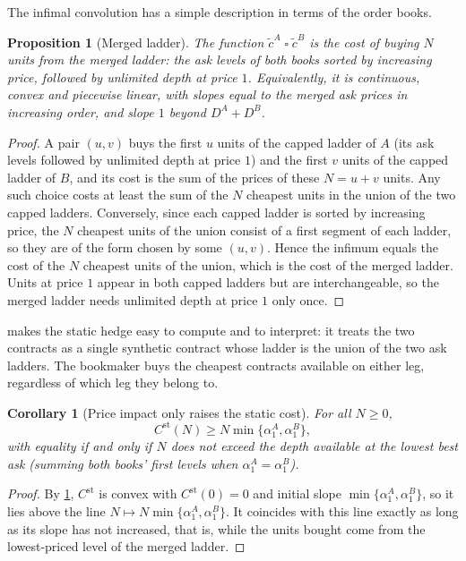 \documentclass[11pt,a4paper]{article}
\theoremstyle{plain}
\newtheorem{proposition}[theorem]{Proposition}
\newtheorem{corollary}[theorem]{Corollary}
\theoremstyle{definition}
\theoremstyle{remark}
\newcommand{\1}{\mathbf{1}}
\newcommand{\infconv}{\mathbin{\square}}
\begin{document}
The infimal convolution has a simple description in terms of the order books.

\begin{proposition}[Merged ladder]
\label{prop:merged}
The function $\tilde c^A\infconv\tilde c^B$ is the cost of buying $N$ units from the \emph{merged ladder}: the ask levels of both books sorted by increasing price, followed by unlimited depth at price $1$. Equivalently, it is continuous, convex and piecewise linear, with slopes equal to the merged ask prices in increasing order, and slope $1$ beyond $D^A+D^B$.
\end{proposition}

\begin{proof}
A pair $(u,v)$ buys the first $u$ units of the capped ladder of $A$ (its ask levels followed by unlimited depth at price $1$) and the first $v$ units of the capped ladder of $B$, and its cost is the sum of the prices of these $N=u+v$ units. Any such choice costs at least the sum of the $N$ cheapest units in the union of the two capped ladders. Conversely, since each capped ladder is sorted by increasing price, the $N$ cheapest units of the union consist of a first segment of each ladder, so they are of the form chosen by some $(u,v)$. Hence the infimum equals the cost of the $N$ cheapest units of the union, which is the cost of the merged ladder. Units at price $1$ appear in both capped ladders but are interchangeable, so the merged ladder needs unlimited depth at price $1$ only once.
\end{proof}

 makes the static hedge easy to compute and to interpret: it treats the two contracts as a single synthetic contract whose ladder is the union of the two ask ladders. The bookmaker buys the cheapest contracts available on either leg, regardless of which leg they belong to.

\begin{corollary}[Price impact only raises the static cost]
\label{cor:static-lower}
For all $N\geq 0$,
\[
C^{\mathrm{st}}(N)\geq N\min\{\alpha^A_1,\alpha^B_1\},
\]
with equality if and only if $N$ does not exceed the depth available at the lowest best ask (summing both books' first levels when $\alpha^A_1=\alpha^B_1$).
\end{corollary}

\begin{proof}
By \cref{prop:merged}, $C^{\mathrm{st}}$ is convex with $C^{\mathrm{st}}(0)=0$ and initial slope $\min\{\alpha^A_1,\alpha^B_1\}$, so it lies above the line $N\mapsto N\min\{\alpha^A_1,\alpha^B_1\}$. It coincides with this line exactly as long as its slope has not increased, that is, while the units bought come from the lowest-priced level of the merged ladder.
\end{proof}
\end{document}
